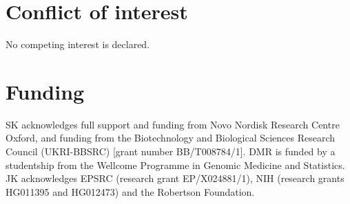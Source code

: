 \documentclass[unnumsec,webpdf,contemporary,large,namedate]{oup-authoring-template}%
\begin{document}
\section*{Conflict of interest}
No competing interest is declared.

\section*{Funding}
SK acknowledges full support and funding from Novo Nordisk Research Centre Oxford,
and funding from the Biotechnology and Biological Sciences Research Council 
(UKRI-BBSRC) [grant number BB/T008784/1]. DMR is funded by 
a studentship from the Wellcome Programme in Genomic Medicine and Statistics.
JK acknowledges EPSRC (research grant EP/X024881/1),
NIH (research grants HG011395 and HG012473)
and the Robertson Foundation.



\end{document}
